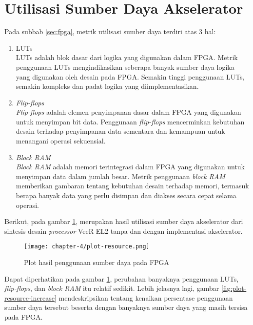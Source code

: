 \section{Utilisasi Sumber Daya Akselerator}

Pada subbab \ref{sec:fpga}, metrik utilisasi sumber daya terdiri atas 3 hal:

\begin{enumerate}
	\item \acf{LUTs}\\
	      \ac{LUTs} adalah blok dasar dari logika yang digunakan dalam \ac{FPGA}. Metrik penggunaan \ac{LUTs} mengindikasikan seberapa banyak sumber daya logika yang digunakan oleh desain pada \ac{FPGA}. Semakin tinggi penggunaan \ac{LUTs}, semakin kompleks dan padat logika yang diimplementasikan.
	\item \textit{Flip-flops}\\
	      \textit{Flip-flops} adalah elemen penyimpanan dasar dalam \ac{FPGA} yang digunakan untuk menyimpan bit data. Penggunaan \textit{flip-flops} mencerminkan kebutuhan desain terhadap penyimpanan data sementara dan kemampuan untuk menangani operasi sekuensial.
	\item \textit{Block \ac{RAM}}\\
	      \textit{Block \ac{RAM}} adalah memori terintegrasi dalam \ac{FPGA} yang digunakan untuk menyimpan data dalam jumlah besar. Metrik penggunaan \textit{block \ac{RAM}} memberikan gambaran tentang kebutuhan desain terhadap memori, termasuk berapa banyak data yang perlu disimpan dan diakses secara cepat selama operasi.
\end{enumerate}

Berikut, pada gambar \ref{fig:plot-resource}, merupakan hasil utilisasi sumber daya akselerator dari sintesis desain \textit{processor} VeeR EL2 tanpa dan dengan implementasi akselerator.

\begin{figure}[h]
	\centering
	\texttt{[image: chapter-4/plot-resource.png]}
	\caption{Plot hasil penggunaan sumber daya pada \ac{FPGA}}
	\label{fig:plot-resource}
\end{figure}

Dapat diperhatikan pada gambar \ref{fig:plot-resource}, perubahan banyaknya penggunaan \ac{LUTs}, \textit{flip-flops}, dan \textit{block \ac{RAM}} itu relatif sedikit. Lebih jelasnya lagi, gambar \ref{fig:plot-resource-increase} mendeskripsikan tentang kenaikan persentase penggunaan sumber daya tersebut beserta dengan banyaknya sumber daya yang masih tersisa pada \ac{FPGA}.

